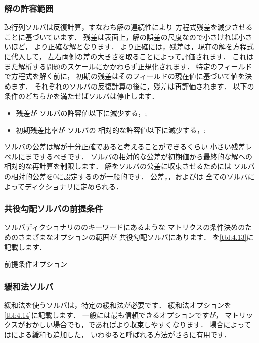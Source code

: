 \subsubsection{解の許容範囲}
\label{sssec:4.5.1.1}
疎行列ソルバは反復計算，すなわち解の連続性により
方程式残差を減少させることに基づいています．
残差は表面上，解の誤差の尺度なので小さければ小さいほど，
より正確な解となります．
より正確には，残差は，現在の解を方程式に代入して，
左右両側の差の大きさを取ることによって評価されます．
これはまた解析する問題のスケールにかかわらず正規化されます．
特定のフィールドで方程式を解く前に，
初期の残差はそのフィールドの現在値に基づいて値を決めます．
それぞれのソルバの反復計算の後に，残差は再評価されます．
以下の条件のどちらかを満たせばソルバは停止します．
\begin{itemize}
 \item 残差が
%
%
       ソルバの許容値以下に減少する，;
 \item 初期残差比率が
%
%
       ソルバの
%
       相対的な許容値以下に減少する，;
\end{itemize}
ソルバの公差は解が十分正確であると考えることができるくらい
小さい残差レベルにまでするべきです．
ソルバの相対的な公差が初期値から最終的な解への相対的な再計算を制限します．
解をソルバの公差に収束させるためには
ソルバの相対的公差を$0$に設定するのが一般的です．
公差，，およびは
全てのソルバによってディクショナリに定められる．

\subsubsection{共役勾配ソルバの前提条件}
\label{sssec:4.5.1.2}
ソルバディクショナリののキーワードにあるような
マトリクスの条件決めのためのさまざまなオプションの範囲が
共役勾配ソルバにあります．
を\autoref{tbl:4.13}に記載します．


\begin{table}[ht]
 
 \caption{前提条件オプション}
 \label{tbl:4.13}
\end{table}


\subsubsection{緩和法ソルバ}
\label{sssec:4.5.1.3}
緩和法を使うソルバは，特定の緩和法が必要です．
緩和法オプションを\autoref{tbl:4.14}に記載します．
一般には最も信頼できるオプションですが，
マトリックスがおかしい場合でも，であればより収束しやすくなります．
場合によってはによる緩和も追加した，
いわゆると呼ばれる方法がさらに有用です．


